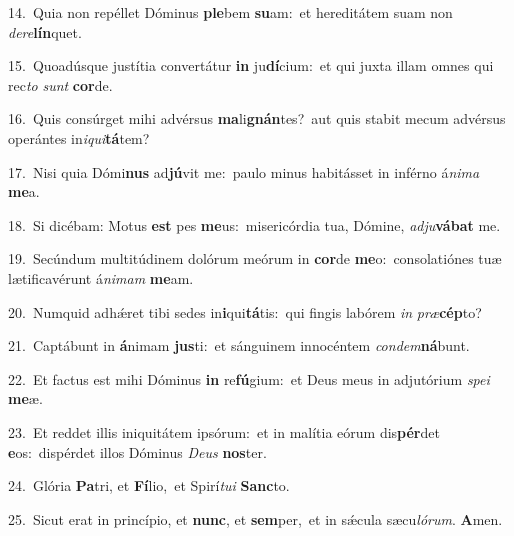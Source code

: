 {\numbfont\textcolor{\numbcolor}{14.}}~Quia non repéllet Dóminus \textbf{ple}\-bem \textbf{su}\-am:~\star et hereditátem suam non \textit{de}\-\textit{re}\textbf{lín}quet.\par
{\numbfont\textcolor{\numbcolor}{15.}}~Quoadúsque justítia convertátur \textbf{in} ju\-\textbf{dí}\-cium:~\star et qui juxta illam omnes qui rec\textit{to} \textit{sunt} \textbf{cor}\-de.\par
{\numbfont\textcolor{\numbcolor}{16.}}~Quis consúrget mihi advérsus \textbf{ma}\-li\-\textbf{gnán}\-tes?~\star aut quis stabit mecum advérsus operántes in\-\textit{i}\-\textit{qui}\textbf{tá}tem?\par
{\numbfont\textcolor{\numbcolor}{17.}}~Nisi quia Dómi\textbf{nus} ad\-\textbf{jú}\-vit me:~\star paulo minus habitásset in inférno á\-\textit{ni}\-\textit{ma} \textbf{me}\-a.\par
{\numbfont\textcolor{\numbcolor}{18.}}~Si dicébam: Motus \textbf{est} pes \textbf{me}\-us:~\star misericórdia tua, Dómine, \textit{ad}\-\textit{ju}\textbf{vá}\textbf{bat} me.\par
{\numbfont\textcolor{\numbcolor}{19.}}~Secúndum multitúdinem dolórum meórum in \textbf{cor}\-de \textbf{me}\-o:~\star consolatiónes tuæ lætificavérunt á\-\textit{ni}\-\textit{mam} \textbf{me}\-am.\par
{\numbfont\textcolor{\numbcolor}{20.}}~Numquid adhǽret tibi sedes in\-\textbf{i}\-qui\-\textbf{tá}\-tis:~\star qui fingis labórem \textit{in} \textit{præ}\-\textbf{cép}to?\par
{\numbfont\textcolor{\numbcolor}{21.}}~Captábunt in \textbf{á}\-nimam \textbf{jus}\-ti:~\star et sánguinem innocéntem \textit{con}\-\textit{dem}\textbf{ná}bunt.\par
{\numbfont\textcolor{\numbcolor}{22.}}~Et factus est mihi Dóminus \textbf{in} re\-\textbf{fú}\-gium:~\star et Deus meus in adjutórium \textit{spe}\-\textit{i} \textbf{me}\-æ.\par
{\numbfont\textcolor{\numbcolor}{23.}}~Et reddet illis iniquitátem ipsórum:~\dagger et in malítia eórum dis\-\textbf{pér}\-det \textbf{e}\-os:~\star dispérdet illos Dóminus \textit{De}\-\textit{us} \textbf{nos}\-ter.\par
{\numbfont\textcolor{\numbcolor}{24.}}~Glória \textbf{Pa}\-tri, et \textbf{Fí}\-lio,~\star et Spirí\-\textit{tu}\-\textit{i} \textbf{Sanc}\-to.\par
{\numbfont\textcolor{\numbcolor}{25.}}~Sicut erat in princípio, et \textbf{nunc}\-, et \textbf{sem}\-per,~\star et in sǽcula sæcu\-\textit{ló}\-\textit{rum}. \textbf{A}\-men.\par
